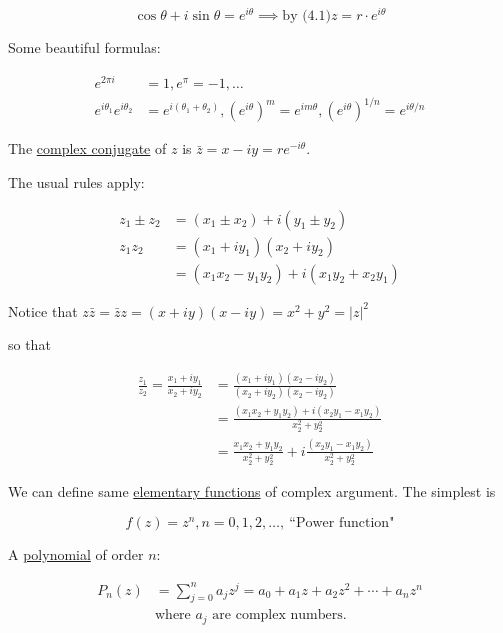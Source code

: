\documentclass[twoside]{article}
\newcommand*\mean[1]{\bar{#1}}
\begin{document}
$$\cos\theta + i\sin\theta =e^{i\theta}\implies \text{by (4.1)} z=r\cdot e^{i\theta}$$

Some beautiful formulas:

\begin{equation}
	\begin{split}
		e^{2\pi i}&=1, e^{\pi}=-1, \dots\\
		e^{i\theta_1}e^{i\theta_2}&=e^{i(\theta_1+\theta_2)}, (e^{i\theta})^m=e^{im\theta}, (e^{i\theta})^{1/n}=e^{i\theta/n}
	\end{split}
\end{equation}

The \underline{complex conjugate} of $z$ is $\mean{z}=x-iy=re^{-i\theta}$.

The usual rules apply:

\begin{equation}
	\begin{split}
		z_1\pm z_2 &= (x_1\pm x_2)+ i(y_1\pm y_2)\\
		z_1z_2 &= (x_1+iy_1)(x_2+iy_2)\\
		&=(x_1x_2-y_1y_2)+i(x_1y_2+x_2y_1)		
	\end{split}
\end{equation}

Notice that $z\mean{z}=\mean{z}z=(x+iy)(x-iy)=x^2+y^2=\lvert z\rvert ^2$

so that

\begin{equation}
	\begin{split}
		\frac{z_1}{z_2}=\frac{x_1+iy_1}{x_2+iy_2}&=\frac{(x_1+iy_1)(x_2-iy_2)}{(x_2+iy_2)(x_2-iy_2)}\\
			&=\frac{(x_1x_2+y_1y_2)+i(x_2y_1-x_1y_2)}{x_2^2+y_2^2}\\
			&=\frac{x_1x_2+y_1y_2}{x_2^2+y_2^2}+i\frac{(x_2y_1-x_1y_2)}{x_2^2+y_2^2}
	\end{split}
\end{equation}

We can define same \underline{elementary functions} of complex argument. The simplest is

$$f(z)=z^n, n=0,1,2,\dots,\ \text{``Power function"}$$

A \underline{polynomial} of order $n$:

\begin{equation}
	\begin{split}
		P_n(z)&=\sum^n_{j=0}a_jz^j=a_0+a_1z+a_2z^2+\cdots +a_nz^n\\
		&\text{where $a_j$ are complex numbers.}
	\end{split}
\end{equation}
\end{document}

